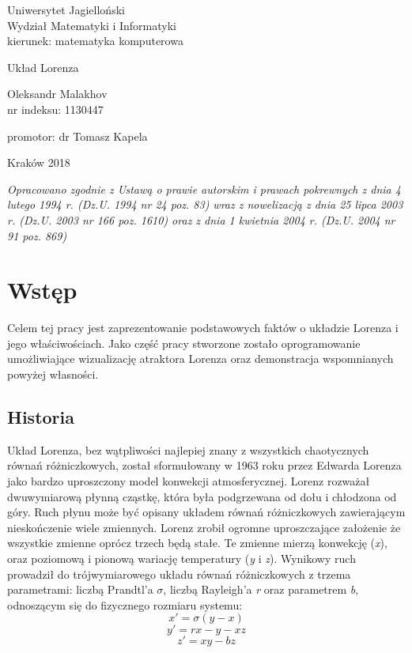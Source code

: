 \documentclass[12pt]{report}
\begin{document}
\begin{titlepage}
	\begin{center}
	\large 
	Uniwersytet Jagielloński\\
	Wydział Matematyki i Informatyki\\
	kierunek: matematyka komputerowa
	
	\vspace{5.0cm}
	\huge
	Układ Lorenza
	
	\vspace{1.0cm}
	\large
	Oleksandr Malakhov \\
	nr indeksu: 1130447
	\end{center}
	
	\vspace{3.0cm}
	\begin{flushright}
	promotor: dr Tomasz Kapela
	\end{flushright}
	
	\vspace{3.5cm}
	\begin{center}
		\footnotesize
		Kraków 2018
	\end{center}
	\tiny\textit{Opracowano zgodnie z Ustawą o prawie autorskim i prawach pokrewnych z dnia 4 lutego 1994 r. (Dz.U. 1994 nr 24 poz. 83) wraz z nowelizacją z dnia 25 lipca 2003 r. (Dz.U. 2003 nr 166 poz. 1610) oraz z dnia 1 kwietnia 2004 r. (Dz.U. 2004 nr 91 poz. 869)}
\end{titlepage}

\tableofcontents

\chapter{Wstęp}
	\par Celem tej pracy jest zaprezentowanie podstawowych faktów o układzie Lorenza i jego właściwościach. Jako część pracy stworzone zostało oprogramowanie umożliwiające wizualizację atraktora Lorenza oraz demonstracja wspomnianych powyżej własności.

	\section{Historia}
	\par Układ Lorenza, bez wątpliwości najlepiej znany z wszystkich chaotycznych równań różniczkowych, został sformułowany w 1963 roku przez Edwarda Lorenza jako bardzo uproszczony model konwekcji atmosferycznej. Lorenz rozważał dwuwymiarową płynną cząstkę, która była podgrzewana od dołu i chłodzona od góry. Ruch płynu może być opisany układem równań różniczkowych zawierającym nieskończenie wiele zmiennych. Lorenz zrobił ogromne uproszczające założenie że wszystkie zmienne oprócz trzech będą stałe. Te zmienne mierzą konwekcję (\textit{x}), oraz poziomową i pionową wariację temperatury (\textit{y} i \textit{z}). Wynikowy ruch prowadził do trójwymiarowego układu równań różniczkowych z trzema parametrami: liczbą Prandtl'a $\sigma$, liczbą Rayleigh'a \textit{r} oraz parametrem \textit{b}, odnoszącym się do fizycznego rozmiaru systemu:
		\[ x' = \sigma (y - x) \]
		\[ y' = rx - y - xz \]
		\[ z' = xy - bz \]
\end{document}
